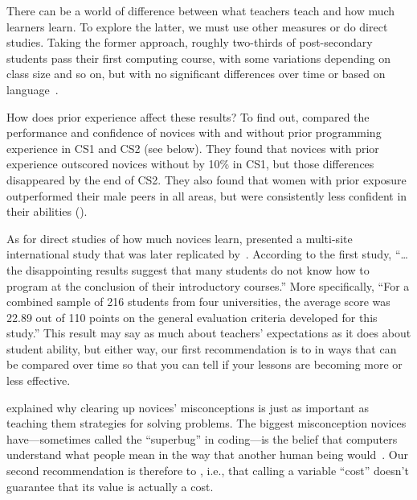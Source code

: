 \newpage
{}


There can be a world of difference between what teachers teach
and how much learners learn.
To explore the latter,
we must use other measures or do direct studies.
Taking the former approach,
roughly two-thirds of post-secondary students pass their first computing course,
with some variations depending on class size and so on,
but with no significant differences over time or based on language~\cite{Benn2007a,Wats2014}.

How does prior experience affect these results?
To find out,
\cite{Wilc2018} compared the performance and confidence of novices
with and without prior programming experience
in CS1 and CS2 (see below).
They found that novices with prior experience outscored novices without by 10\% in CS1,
but those differences disappeared by the end of CS2.
They also found that women with prior exposure outperformed their male peers in all areas,
but were consistently less confident in their abilities ().

As for direct studies of how much novices learn,
\cite{McCr2001} presented a multi-site international study
that was later replicated by~\cite{Utti2013}.
According to the first study,
``{\ldots}the disappointing results suggest that
many students do not know how to program at the conclusion of their introductory courses.''
More specifically,
``For a combined sample of 216 students from four universities,
the average score was 22.89 out of 110 points on the general evaluation criteria developed for this study.''
This result may say as much about teachers' expectations as it does about student ability,
but either way,
our first recommendation is to 
in ways that can be compared over time
so that you can tell if your lessons are becoming more or less effective.


 explained why clearing up novices' misconceptions
is just as important as teaching them strategies for solving problems.
The biggest misconception novices have---sometimes called the ``superbug'' in coding---is
the belief that computers understand what people mean in the way that another human being would~\cite{Pea1986}.
Our second recommendation is therefore to ,
i.e.,
that calling a variable ``cost'' doesn't guarantee that its value is actually a cost.

